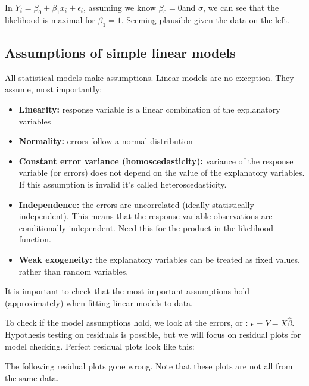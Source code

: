 

In $Y_i=\beta_0+\beta_1x_i+\epsilon_i$, assuming we know $\beta_0=0$and $\sigma$, we can see that the likelihood is maximal for $\beta_1=1$. Seeming plausible given the data on the left.

\subsection{Assumptions of simple linear models}

All statistical models make assumptions. Linear models are no exception. They assume, most importantly:
\begin{itemize}
	\item \textbf{Linearity:} response variable is a linear combination of the explanatory variables
	\item \textbf{Normality:} errors follow a normal distribution
	\item \textbf{Constant error variance (homoscedasticity):} variance of the response variable (or errors) does not depend on the value of the explanatory variables. If this assumption is invalid it's called heteroscedasticity.
	\item \textbf{Independence:} the errors are uncorrelated (ideally statistically independent). This means that the response variable observations are conditionally independent. Need this for the product in the likelihood function.
	\item \textbf{Weak exogeneity:} the explanatory variables can be treated as fixed values, rather than random variables.
\end{itemize}
It is important to check that the most important assumptions hold (approximately) when fitting linear models to data.

To check if the model assumptions hold, we look at the errors, or : $\epsilon=Y-X\hat{\beta}$. Hypothesis testing on residuals is possible, but we will focus on residual plots for model checking. Perfect residual plots look like this:




The following residual plots gone wrong. Note that these plots are not all from the same data.




